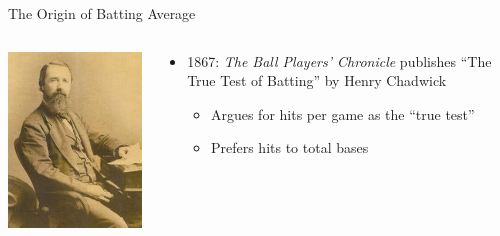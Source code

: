 \documentclass[handout]{beamer}
\begin{document}
\begin{frame}{The Origin of Batting Average}
  \begin{columns}
    \begin{column}{0.2\textwidth}
      \includegraphics[width = \textwidth]{images/chadwick.jpg}
    \end{column}
    \begin{column}{0.8\textwidth}
      \begin{itemize}
        \item 1867: {\it The Ball Players' Chronicle} publishes ``The True Test of Batting'' by Henry Chadwick
        \begin{itemize}
          \item Argues for hits per game as the ``true test''
          \item Prefers hits to total bases
        \end{itemize}
      \end{itemize}
    \end{column}

\end{columns}
\end{frame}
\end{document}
